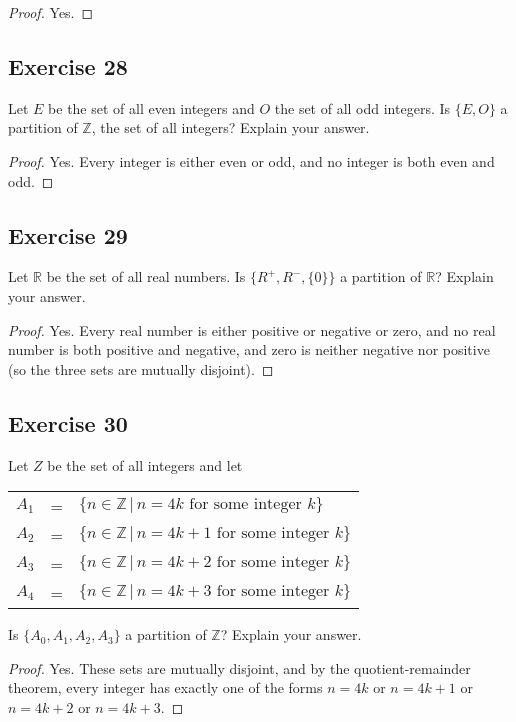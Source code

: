 \documentclass[14pt]{extarticle}
\newcommand{\R}{\mathbb{R}}
\newcommand{\Z}{\mathbb{Z}}
\begin{document}
\begin{proof}
  Yes.
\end{proof}

\subsection{Exercise 28}
Let $E$ be the set of all even integers and $O$ the set of all odd integers. Is \(\{E, O\}\) a partition of $\Z$, the set of all integers? Explain your answer.

\begin{proof}
  Yes. Every integer is either even or odd, and no integer is both even and odd.
\end{proof}

\subsection{Exercise 29}
Let $\R$ be the set of all real numbers. Is $\{R^+, R^-, \{0\}\}$ a partition of $\R$? Explain your answer.

\begin{proof}
  Yes. Every real number is either positive or negative or zero, and no real number is both positive and negative, and
  zero is neither negative nor positive (so the three sets are mutually disjoint).
\end{proof}

\subsection{Exercise 30}
Let $Z$ be the set of all integers and let
\begin{center}
  \begin{tabular}{rcl}
    $A_1$ & = & \(\{n \in \Z \, | \, n = 4k \text{ for some integer } k\}\)     \\
    $A_2$ & = & \(\{n \in \Z \, | \, n = 4k + 1 \text{ for some integer } k\}\) \\
    $A_3$ & = & \(\{n \in \Z \, | \, n = 4k + 2 \text{ for some integer } k\}\) \\
    $A_4$ & = & \(\{n \in \Z \, | \, n = 4k + 3 \text{ for some integer } k\}\)
  \end{tabular}
\end{center}
Is \(\{A_0, A_1, A_2, A_3\}\) a partition of $\Z$? Explain your answer.

\begin{proof}
  Yes. These sets are mutually disjoint, and by the quotient-remainder theorem, every integer has exactly one of the
  forms \(n = 4k\) or \(n = 4k+1\) or \(n = 4k+2\) or \(n = 4k+3\).
\end{proof}
\end{document}
